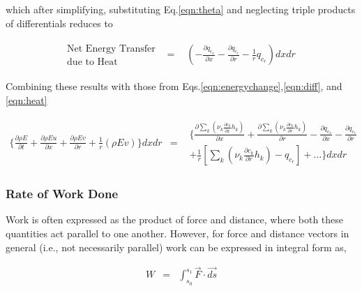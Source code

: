 	which after simplifying, substituting Eq.\ref{eqn:theta} and neglecting triple products of differentials reduces to

\begin{equation}
	\begin{array}{ccc}
	\begin{array}{c}
	\textrm{Net Energy Transfer} \\ \textrm{due to Heat}
	\end{array} & = &
		\begin{array}{c}
			(- \frac{\partial q_{c_x}}{\partial x} - \frac{\partial q_{c_r}}{\partial r}
			- \frac{1}{r} q_{c_r})dxdr
		\end{array}
	\end{array}
\label{eqn:heat}
\end{equation}

	Combining these results with those from Eqs.\ref{eqn:energychange},\ref{eqn:diff}, and \ref{eqn:heat}

\begin{displaymath}
	\begin{array}{ccc}
		\Big\{\frac{\partial \rho E}{\partial t} +\frac{\partial \rho E u}{\partial x} + \frac{\partial \rho E v}
		{\partial r} + \frac{1}{r}(\rho E v)\Big\}dxdr & = &
		\begin{array}{c}
			\Big\{\frac{\partial \sum_k (\nu_k \frac{\partial c_k}{\partial x}h_k)}{\partial x} 
			+\frac{\partial \sum_k (\nu_k \frac{\partial c_k}{\partial r}h_k)}{\partial r}
			-\frac{\partial q_{c_x}}{\partial x} - \frac{\partial q_{c_r}}{\partial r} \\
			+\frac{1}{r}[\sum_k (\nu_k \frac{\partial c_k}{\partial r}h_k) - q_{c_r}] + \ldots \Big\}dxdr	
		\end{array}  
	\end{array}
\end{displaymath}

\subsubsection{Rate of Work Done}

	Work is often expressed as the product of force and distance, where both these
quantities act parallel to one another.  However, for force and distance vectors in general (i.e., not necessarily
parallel) work can be expressed in integral form as,

\begin{displaymath}
	\begin{array}{ccc}
		W & = & \int_{s_0}^{s_1} \vec{F} \cdot \vec{ds}
	\end{array}
\end{displaymath}

